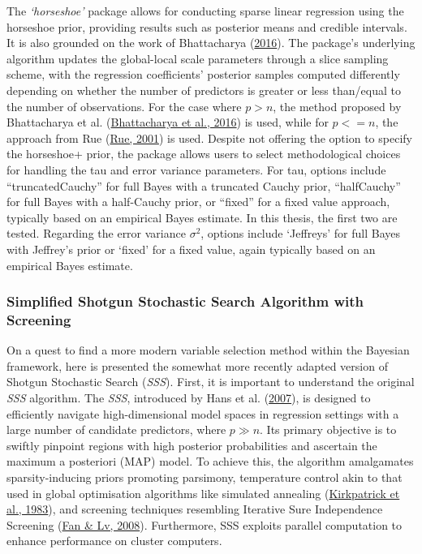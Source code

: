 \documentclass[
  11pt,
]{article}
\begin{document}
\hfill\break

The \emph{`horseshoe'} package allows for conducting sparse linear
regression using the horseshoe prior, providing results such as
posterior means and credible intervals. It is also grounded on the work
of Bhattacharya (\protect\hyperlink{ref-Bhattacharya2016}{2016}). The
package's underlying algorithm updates the global-local scale parameters
through a slice sampling scheme, with the regression coefficients'
posterior samples computed differently depending on whether the number
of predictors is greater or less than/equal to the number of
observations. For the case where \(p > n\), the method proposed by
Bhattacharya et al.
(\protect\hyperlink{ref-Bhattacharya2016}{Bhattacharya et al., 2016}) is
used, while for \(p <= n\), the approach from Rue
(\protect\hyperlink{ref-Rue2001}{Rue, 2001}) is used. Despite not
offering the option to specify the horseshoe+ prior, the package allows
users to select methodological choices for handling the tau and error
variance parameters. For tau, options include ``truncatedCauchy'' for
full Bayes with a truncated Cauchy prior, ``halfCauchy'' for full Bayes
with a half-Cauchy prior, or ``fixed'' for a fixed value approach,
typically based on an empirical Bayes estimate. In this thesis, the
first two are tested. Regarding the error variance \(\sigma^2\), options
include `Jeffreys' for full Bayes with Jeffrey's prior or `fixed' for a
fixed value, again typically based on an empirical Bayes estimate.

\subsubsection{Simplified Shotgun Stochastic Search Algorithm with Screening}

On a quest to find a more modern variable selection method within the
Bayesian framework, here is presented the somewhat more recently adapted
version of Shotgun Stochastic Search (\emph{SSS}). First, it is
important to understand the original \emph{SSS} algorithm. The
\emph{SSS}, introduced by Hans et al.
(\protect\hyperlink{ref-Hans2007}{2007}), is designed to efficiently
navigate high-dimensional model spaces in regression settings with a
large number of candidate predictors, where \(p \gg n\). Its primary
objective is to swiftly pinpoint regions with high posterior
probabilities and ascertain the maximum a posteriori (MAP) model. To
achieve this, the algorithm amalgamates sparsity-inducing priors
promoting parsimony, temperature control akin to that used in global
optimisation algorithms like simulated annealing
(\protect\hyperlink{ref-Vecchi1983}{Kirkpatrick et al., 1983}), and
screening techniques resembling Iterative Sure Independence Screening
(\protect\hyperlink{ref-Fan2008}{Fan \& Lv, 2008}). Furthermore, SSS
exploits parallel computation to enhance performance on cluster
computers.
\end{document}
